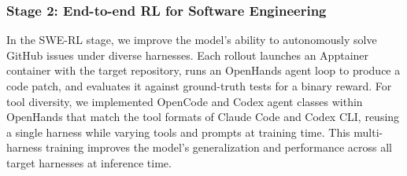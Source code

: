 





\subsubsection{Stage 2: End-to-end RL for Software Engineering}
\label{subsub:swerl}
In the SWE-RL stage, we improve the model's ability to autonomously solve GitHub issues under diverse harnesses. Each rollout launches an Apptainer container with the target repository, runs an OpenHands agent loop to produce a code patch, and evaluates it against ground-truth tests for a binary reward. For tool diversity, we implemented OpenCode and Codex agent classes within OpenHands that match the tool formats of Claude Code and Codex CLI, reusing a single harness while varying tools and prompts at training time. This multi-harness training improves the model's generalization and performance across all target harnesses at inference time.

